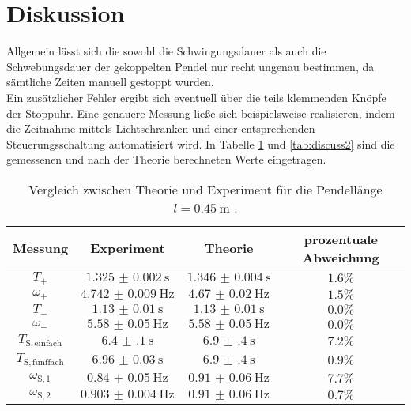 \section{Diskussion}
\label{sec:Diskussion}
Allgemein lässt sich die sowohl die Schwingungsdauer als auch die Schwebungsdauer der gekoppelten Pendel nur recht ungenau bestimmen, da sämtliche Zeiten manuell gestoppt wurden.\\
Ein zusätzlicher Fehler ergibt sich eventuell über die teils klemmenden Knöpfe der Stoppuhr.
Eine genauere Messung ließe sich beispielsweise realisieren, indem die Zeitnahme mittels Lichtschranken und einer entsprechenden Steuerungsschaltung automatisiert wird.
In Tabelle \ref{tab:discuss} und \ref{tab:discuss2} sind die gemessenen und nach der Theorie
berechneten Werte eingetragen.

\begin{table}
	\centering
	\caption{Vergleich zwischen Theorie und Experiment für die Pendellänge $l=\SI{0.45}{\meter}$ .}
	\label{tab:discuss}
	\begin{tabular}{cccc}
		\toprule
		Messung                    & Experiment               & Theorie                  & prozentuale Abweichung \\
		\midrule
		$T_{\mathrm{+}}$           & $\SI{1.325(2)}{\second}$ & $\SI{1.346(4)}{\second}$ & $1.6\%$                \\
		$\omega_{\mathrm{+}}$      & $\SI{4.742(9)}{\Hz}$     & $\SI{4.67(2)}{\Hz}$      & $1.5\%$                \\
		$T_{\mathrm{-}}$           & $\SI{1.13(1)}{\second}$  & $\SI{1.13(1)}{\second}$  & $0.0\% $               \\
		$\omega_{\mathrm{-}}$      & $\SI{5.58(5)}{\Hz}$      & $\SI{5.58(5)}{\Hz}$      & $0.0\%$                \\
		$T_{\mathrm{S,einfach}}$   & $\SI{6.4(1)}{\second}$   & $\SI{6.9(4)}{\second}$   & $7.2\%$                \\
		$T_{\mathrm{S,fünffach}}$ & $\SI{6.96(3)}{\second}$  & $\SI{6.9(4)}{\second}$   & $0.9\%$                \\
		$\omega_{\mathrm{S,1}}$    & $\SI{0.84(5)}{\Hz}$      & $\SI{0.91(6)}{\Hz}$      & $7.7\%$                \\
		$\omega_{\mathrm{S,2}}$    & $\SI{0.903(4)}{\Hz}$     & $\SI{0.91(6)}{\Hz}$      & $0.7\%$                \\
		\bottomrule
	\end{tabular}
\end{table}

